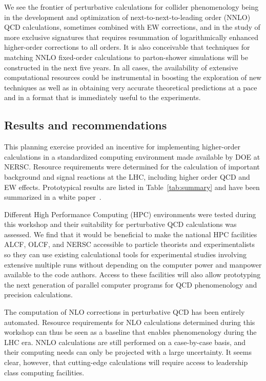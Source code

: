 We see the frontier of perturbative
calculations for collider phenomenology being in the
development and optimization of next-to-next-to-leading order (NNLO)
QCD calculations, sometimes combined with EW corrections, and in the
study of more exclusive signatures that requires resummation 
of logarithmically enhanced higher-order corrections to all orders.
It is also conceivable that techniques for matching NNLO fixed-order 
calculations to parton-shower simulations will be constructed in the 
next five years. In all cases, the availability 
of extensive computational resources could be instrumental
in boosting the exploration of new techniques as well as in
obtaining very accurate theoretical predictions at a pace and in a
format that is immediately useful to the experiments.

\subsection{Results and recommendations}

This planning exercise provided an incentive for implementing higher-order  
calculations in a standardized computing environment made available 
by DOE at 
NERSC.  Resource requirements were determined for the
calculation of important background and signal reactions at the
LHC, including higher order QCD and EW effects. Prototypical results 
are listed in Table~\ref{tab:summary} and have been summarized in a 
white paper~\cite{HPCWP}.

Different High Performance Computing (HPC) environments were tested
during this workshop and their suitability for perturbative QCD calculations 
was assessed. We find that it would be beneficial to make the national HPC 
facilities ALCF, OLCF, and NERSC accessible to particle theorists and
experimentalists so they can use existing
calculational tools for experimental studies involving extensive
multiple runs without depending on the computer power and manpower
available to the code authors. Access to these facilities will also
allow prototyping the next generation of parallel computer programs
for QCD phenomenology and precision calculations.

The computation of NLO corrections in perturbative QCD has been entirely
automated. Resource requirements for NLO calculations determined during 
this workshop can thus be seen as a baseline that enables phenomenology 
during the LHC era. NNLO calculations are still performed 
on a case-by-case basis, and their computing needs can only be 
projected with a large uncertainty. It seems clear, however, that cutting-edge 
calculations will require access to leadership class computing facilities.

